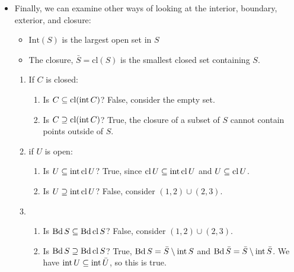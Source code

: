 \begin{itemize}
\begin{itemize}
          \end{itemize}
    \item Finally, we can examine other ways of looking at the interior, boundary, exterior, and closure:
          \begin{itemize}
              \item $\text{Int}(S)$ is the largest open set in $S$
              \item The closure, $\bar{S}=\text{cl}(S)$ is the smallest closed set containing $S$.
          \end{itemize}
          \begin{example}
              \begin{enumerate}
                  \item If $C$ is closed:
                        \begin{enumerate}
                            \item Is $C \subseteq \operatorname{cl}(\operatorname{int} C)$? {\color{red} False, consider the empty set.}
                            \item Is $C \supseteq \operatorname{cl}(\operatorname{int} C)$? {\color{red} True, the closure of a subset of $S$ cannot contain points outside of $S$.}
                        \end{enumerate}
                  \item if $U$ is open:
                        \begin{enumerate}
                            \item Is $U\subseteq \operatorname{int}\operatorname{cl} U$? {\color{red} True, since $\operatorname{cl} U \subseteq \operatorname{int} \operatorname{cl} U$ and $U\subseteq \operatorname{cl} U$. }
                            \item Is $U\supseteq \operatorname{int}\operatorname{cl} U$? {\color{red} False, consider $(1,2)\cup (2,3)$. }
                        \end{enumerate}
                  \item \begin{enumerate}
                            \item Is $\operatorname{Bd} S \subseteq \operatorname{Bd} \operatorname{cl} S$? {\color{red} False, consider $(1,2)\cup (2,3)$. }
                            \item Is $\operatorname{Bd} S \supseteq \operatorname{Bd} \operatorname{cl} S$? {\color{red} True, $\operatorname{Bd} S = \bar{S} \setminus \operatorname{int} S$ and $\operatorname{Bd} \bar{S} = \bar{S} \setminus \operatorname{int} \bar{S}$. We have $\operatorname{int} U \subseteq \operatorname{int}\bar{U}$, so this is true.}
                        \end{enumerate}
              \end{enumerate}
          \end{example}

\end{itemize}
